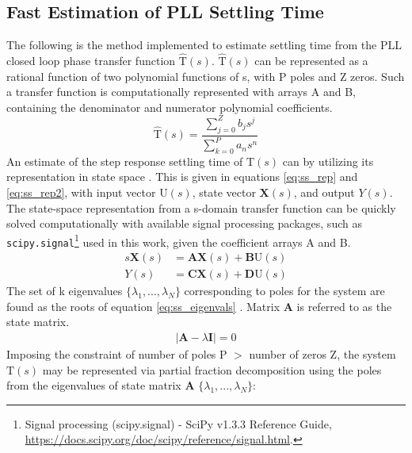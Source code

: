 \subsection{Fast Estimation of PLL Settling Time}\label{est_set}
	The following is the method implemented to estimate settling time from the PLL closed loop phase transfer function $\mathrm{\hat{T}}(s)$. $\mathrm{\hat{T}}(s)$ can be represented as a rational function of two polynomial functions of s, with P poles and Z zeros. Such a transfer function is computationally represented with arrays A and B, containing the denominator and numerator polynomial coefficients.
	\begin{equation}\label{eq:pll_cl_tf}
	\mathrm{\hat{T}}(s) = \frac{\sum_{j=0}^Z b_js^j}{\sum_{k=0}^P a_ns^n}
	\end{equation}
	An estimate of the step response settling time of $\mathrm{T}(s)$ can by utilizing its representation in state space \cite{ogata_2010_ss}. This is given in equations \ref{eq:ss_rep} and \ref{eq:ss_rep2}, with input vector $\mathrm{U}(s)$, state vector $\mathbf{X}(s)$, and output $Y(s)$. The state-space representation from a s-domain transfer function can be quickly solved computationally with available signal processing packages, such as \texttt{scipy.signal}\footnote{Signal processing (scipy.signal) - SciPy v1.3.3 Reference Guide, \url{https://docs.scipy.org/doc/scipy/reference/signal.html}.} used in this work, given the coefficient arrays A and B.
	\begin{align} \label{eq:ss_rep}
		s\mathbf{X}(s) &= \mathbf{AX}(s) +\mathbf{B}\mathrm{U}(s)\\
		Y(s) &= \mathbf{CX}(s) +\mathbf{D}\mathrm{U}(s)\label{eq:ss_rep2}
	\end{align}
	The set of k eigenvalues $\{\lambda_1, ... , \lambda_{N}\}$ corresponding to poles for the system are found as the roots of equation \ref{eq:ss_eigenvals} \cite{brockett_1965}. Matrix $\mathbf{A}$ is referred to as the state matrix.%
	\begin{align}
		|\mathbf{A} - \lambda \mathbf{I}| = 0\label{eq:ss_eigenvals}%
	\end{align}
	Imposing the constraint of number of poles P $>$ number of zeros Z, the system $\mathrm{T}(s)$ may be represented via partial fraction decomposition using the poles from the eigenvalues of state matrix $\mathbf{A}$ $\{\lambda_1, ... , \lambda_{N}\}$:
